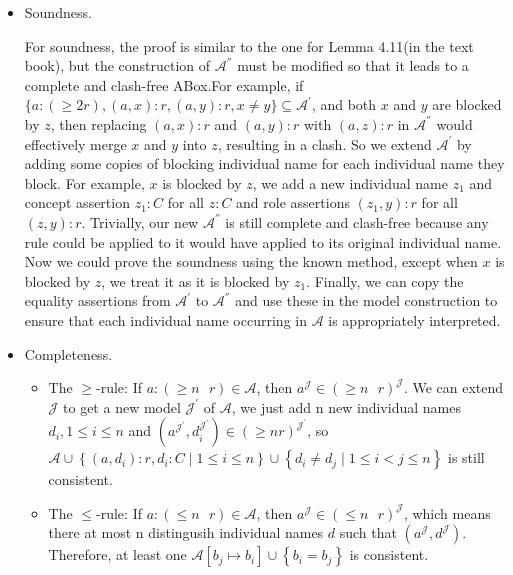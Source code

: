 \documentclass[12pt]{article}
\begin{document}
    \begin{itemize}
        \item Soundness. \par
        For soundness, the proof is similar to the one for Lemma 4.11(in the text book), but the construction of $\mathcal{A}^{''}$ must be modified so that it leads to a complete and clash-free ABox.For example, if $\{a:(\geqslant 2 r),(a, x): r,(a, y): r, x \neq y\} \subseteq \mathcal{A}^{'}$, and both $x$ and $y$ are blocked by $z$, then replacing $(a, x) : r$
        and $(a, y) : r$ with $(a, z) : r$ in $\mathcal{A}^{''}$ would effectively merge $x$ and $y$ into $z$,
        resulting in a clash. So we extend $\mathcal{A}^{'}$ by adding some copies of blocking individual name for each individual name they block. For example, $x$ is blocked by $z$, we add a new individual name $z_1$
        and concept assertion $z_1: C$ for all $z : C$ and role assertions $(z_1, y): r$ for all $(z, y): r$. Trivially, our
        new $\mathcal{A}^{''}$ is still complete and clash-free because any rule could be applied to it would have applied
        to its original individual name. Now we could prove the soundness using the known method, except
        when $x$ is blocked by $z$, we treat it as it is blocked by $z_1$.
        Finally, we
        can copy the equality assertions from $\mathcal{A}^{'}$ to $\mathcal{A}^{''}$ and use these in the
        model construction to ensure that each individual name occurring in $\mathcal{A}$
        is appropriately interpreted.
        \item Completeness. \par
        \begin{itemize}
            \item The $\geq$-rule: If $a : (\geq n \text{ } r) \in \mathcal{A}$, then $a^{\mathcal{J}} \in (\geq n \text{ } r)^{\mathcal{J}}$. We can extend $\mathcal{J}$ to get a new model $\mathcal{J}^{'}$ of $\mathcal{A}$, we just add n new individual names $d_i, 1 \leq i \leq n$ and $(a^{\mathcal{J}^{'}}, d_{i}^{\mathcal{J}^{'}}) \in(\geq n r)^{\mathcal{J}^{'}}$, so $\mathcal{A} \cup\left\{\left(a, d_{i}\right): r, d_{i}: C \mid 1 \leq i \leq n\right\} \cup\left\{d_{i} \neq d_{j} \mid 1 \leq i<j \leq n\right\}$ is still consistent.
            \item The $\leq$-rule: If $a : (\leq n \text{ } r) \in \mathcal{A}$, then $a^{\mathcal{J}} \in (\leq n \text{ } r)^{\mathcal{J}}$, which means there at most n distingusih individual names $d$ such that $(a^{\mathcal{J}}, d^{\mathcal{J}})$. Therefore, at least one $\mathcal{A}\left[b_{j} \mapsto b_{i}\right] \cup\left\{b_{i}=b_{j}\right\}$ is consistent. 
        \end{itemize}
    \end{itemize}
\end{document}
